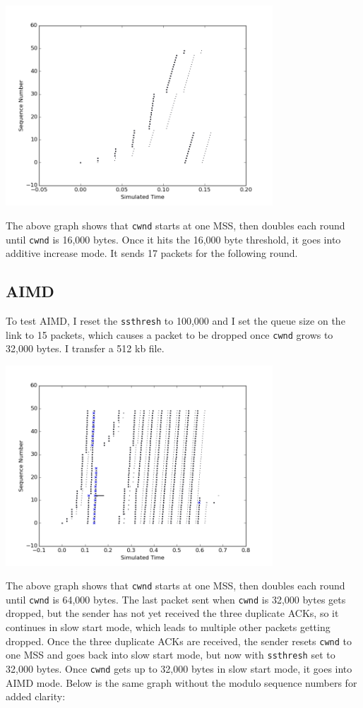 \documentclass[11pt]{article}
\newcommand{\code}[1]{\texttt{#1}}
\begin{document}
\includegraphics[width=10cm]{../graphs/additive_increase.png}

The above graph shows that \code{cwnd} starts at one MSS, then doubles each round until \code{cwnd} is 16,000 bytes. Once it hits the 16,000 byte threshold, it goes into additive increase mode. It sends 17 packets for the following round.

\pagebreak
\subsection{AIMD}
To test AIMD, I reset the \code{ssthresh} to 100,000 and I set the queue size on the link to 15 packets, which causes a packet to be dropped once \code{cwnd} grows to 32,000 bytes. I transfer a 512 kb file.

\includegraphics[width=10cm]{../graphs/aimd_with_mod.png}

The above graph shows that \code{cwnd} starts at one MSS, then doubles each round until \code{cwnd} is 64,000 bytes. The last packet sent when \code{cwnd} is 32,000 bytes gets dropped, but the sender has not yet received the three duplicate ACKs, so it continues in slow start mode, which leads to multiple other packets getting dropped. Once the three duplicate ACKs are received, the sender resets \code{cwnd} to one MSS and goes back into slow start mode, but now with \code{ssthresh} set to 32,000 bytes. Once \code{cwnd} gets up to 32,000 bytes in slow start mode, it goes into AIMD mode. Below is the same graph without the modulo sequence numbers for added clarity:
\end{document}
